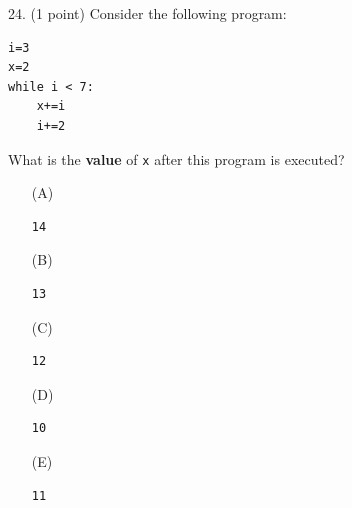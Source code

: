 \documentclass{article}
\begin{document}
\noindent
\begin{minipage}{\textwidth}
24. (1 point)
Consider the following program:
\begin{verbatim}
i=3
x=2
while i < 7:
    x+=i
    i+=2
\end{verbatim}
What is the \textbf{value} of \texttt{x} after this program is executed?

\begin{enumerate}
\item[(A)]
\begin{verbatim}14\end{verbatim}

\item[(B)]
\begin{verbatim}13\end{verbatim}

\item[(C)]
\begin{verbatim}12\end{verbatim}

\item[(D)]
\begin{verbatim}10\end{verbatim}

\item[(E)]
\begin{verbatim}11\end{verbatim}

\end{enumerate}
\end{minipage}
\vspace{2em}
\filbreak\vfil{}\vfilneg
\end{document}
